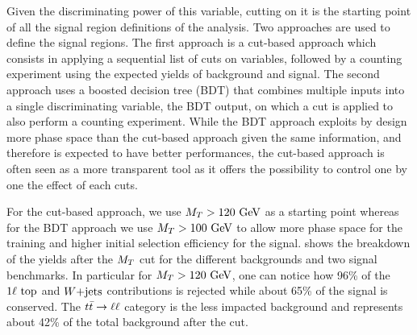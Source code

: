     Given the discriminating power of this variable, cutting on it is the
    starting point of all the signal region definitions of the analysis.
    Two approaches are used to define the signal regions. The first approach is a
    cut-based approach which consists in applying a sequential list of cuts on variables,
    followed by a counting experiment using the expected yields of background
    and signal. The second approach uses a boosted decision tree (BDT) that combines multiple inputs
    into a single discriminating variable, the BDT output, on which a cut is applied to
    also perform a counting experiment. While the BDT approach exploits by design more
    phase space than the cut-based approach given the same information, and therefore is
    expected to have better performances, the cut-based approach is often seen as a more
    transparent tool as it offers the possibility to control one by one the effect of each
    cuts.

    For the cut-based approach, we use $M_T > 120 ~\text{GeV}$ as a starting point
    whereas for the BDT approach we use $M_T > 100 ~\text{GeV}$ to allow more phase space for the
    training and higher initial selection efficiency for the signal. 
    shows the breakdown of the yields after the $M_T$ cut for the different backgrounds and two signal benchmarks.
    In particular for $M_T > 120~\text{GeV}$, one can notice how 96\% of the $1\ell~\text{top}$ and
    $\text{$W$+jets}$ contributions is rejected while about 65\% of the signal is conserved. The
    $t\bar{t} \rightarrow \ell \ell$ category is the less impacted background and represents about
    42\% of the total background after the cut.


